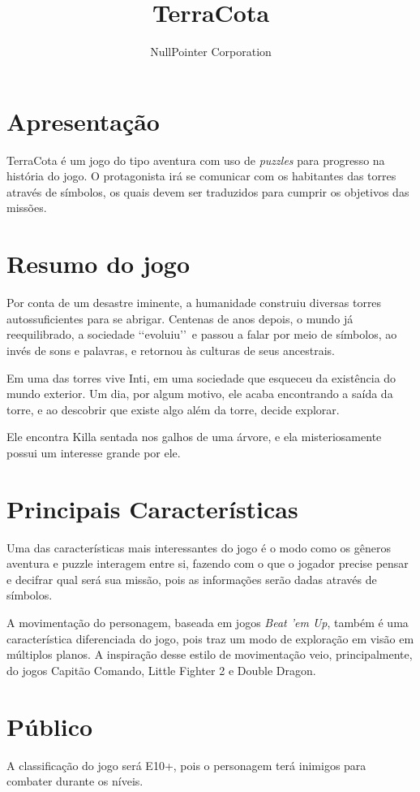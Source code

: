\documentclass[11pt]{article}
\begin{document}
\title{TerraCota}
\author{NullPointer Corporation}
\date{}
\maketitle

\newpage

\tableofcontents
\newpage
\section{Apresentação}
TerraCota é um jogo do tipo aventura com uso de \textit{puzzles} para progresso na história do jogo.  O protagonista irá se comunicar com os habitantes das torres através de símbolos, os quais devem ser traduzidos para cumprir os objetivos das missões.

\section{Resumo do jogo}
Por conta de um desastre iminente, a humanidade construiu diversas torres autossuficientes para se abrigar.
Centenas de anos depois, o mundo já reequilibrado, a sociedade \lq\lq evoluiu\rq\rq\ e passou a falar por meio de símbolos, ao invés de sons e palavras, e retornou às culturas de seus ancestrais.

Em uma das torres vive Inti, em uma sociedade que esqueceu da existência do mundo exterior.  Um dia, por algum motivo, ele acaba encontrando a saída da torre, e ao descobrir que existe algo além da torre, decide explorar.

Ele encontra Killa sentada nos galhos de uma árvore, e ela misteriosamente possui um interesse grande por ele.

\section{Principais Características}
Uma das características mais interessantes do jogo é o modo como os gêneros aventura e puzzle interagem entre si, fazendo com o que o jogador precise pensar e decifrar qual será sua missão, pois as informações serão dadas através de símbolos.

A movimentação do personagem, baseada em jogos \textit{Beat 'em Up}, também é uma característica diferenciada do jogo, pois traz um modo de exploração em visão em múltiplos planos. A inspiração desse estilo de movimentação veio, principalmente, do jogos Capitão Comando, Little Fighter 2 e Double Dragon.

\section{Público}
A classificação do jogo será E10+, pois o personagem terá inimigos para combater durante os níveis.
\end{document}
